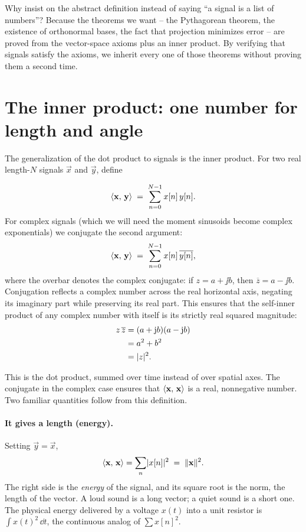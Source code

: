 \begin{whybox}
Why insist on the abstract definition instead of saying ``a signal is a list of numbers''?
Because the theorems we want -- the Pythagorean theorem, the existence of orthonormal bases, the
fact that projection minimizes error -- are proved from the vector-space axioms plus an
inner product. By verifying that signals satisfy the axioms, we inherit every one of those theorems
without proving them a second time.
\end{whybox}

\section{The inner product: one number for length and angle}
\label{ch03:inner}

The generalization of the dot product to signals is the inner product. For two real length-$N$ signals $\vec{x}$ and $\vec{y}$, define

\begin{definition}
\label{ch03:def-inner}
\[
  \langle \mathbf{x},\, \mathbf{y} \rangle \;=\; \sum_{n=0}^{N-1} x[n]\, y[n].
\]
For complex signals (which we will need the moment sinusoids become complex exponentials) we
conjugate the second argument:
\[
  \langle \mathbf{x},\, \mathbf{y} \rangle \;=\; \sum_{n=0}^{N-1} x[n]\, \overline{y[n]} ,
\]
where the overbar denotes the complex conjugate: if $z = a + \jj b$, then $\overline{z} = a - \jj b$.
Conjugation reflects a complex number across the real horizontal axis, negating its imaginary part
while preserving its real part. This ensures that the self-inner product of any complex number with itself
is its strictly real squared magnitude:
\begin{align*}
  z\,\overline{z} &= (a+\mathrm{j} b)(a-\mathrm{j} b) \\
  &= a^2 + b^2 \\
  &= \lvert z\rvert^2 .
\end{align*}
\end{definition}

This is the dot product, summed over time instead of over spatial axes. The conjugate in the
complex case ensures that $\langle \mathbf{x},\, \mathbf{x} \rangle$ is a real, nonnegative number. Two familiar quantities follow from this definition.

\paragraph{It gives a length (energy).} Setting $\vec{y}=\vec{x}$,
\[
  \langle \mathbf{x},\, \mathbf{x} \rangle = \sum_{n} \lvert x[n]\rvert^2 \;=\; \lVert\mathbf{x}\rVert^2 .
\]
The right side is the \emph{energy} of the signal, and its square root is the norm, the length of the
vector. A loud sound is a long vector; a quiet sound is a short one. The physical
energy delivered by a voltage $x(t)$ into a unit resistor is $\int x(t)^2\,\dd t$, the
continuous analog of $\sum x[n]^2$.

